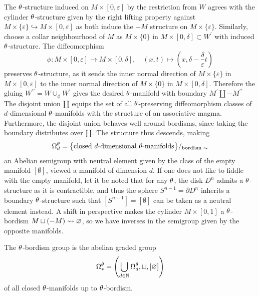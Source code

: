 The $\theta$-structure induced on $M\times[0,\varepsilon]$ by the restriction from $W$ agrees with the cylinder $\theta$-structure given by the right lifting property against $M\times\{\varepsilon\} \hookrightarrow M\times[0,\varepsilon]$ as both induce the $-M$ structure on $M\times\{\varepsilon\}$.
Similarly, choose a collar neighbourhood of $M$ as $M\times\{0\}$ in $M\times[0,\delta]\subset W^\prime$ with induced $\theta$-structure.
The diffeomorphism 
\begin{equation*}
    \phi\colon M\times[0,\varepsilon] \to M\times[0,\delta],\quad (x,t)\mapsto \left(x,\delta -\frac{\delta}{\varepsilon}t\right)
\end{equation*}
preserves $\theta$-structure, as it sends the inner normal direction of $M\times\{\varepsilon\}$ in $M\times[0,\varepsilon]$ to the inner normal direction of $M\times\{0\}$ in $M\times[0,\delta]$.
Therefore the gluing $W^{\prime\prime} = W \cup_\phi W^\prime$ gives the desired $\theta$-manifold with boundary $M^\prime\amalg -M^{\prime\prime}$
\endprf
The disjoint union $\amalg$ equips the set of all $\theta$-preserving diffeomorphism classes of $d$-dimensional $\theta$-manifolds with the structure of an associative magma.
Furthermore, the disjoint union behaves well around bordisms, since taking the boundary distributes over $\amalg$.
The structure thus descends, making
\begin{equation*}
    \Omega_d^\theta = \big\{\text{closed } d\text{-dimensional } \theta\text{-manifolds}\big\}/_{\text{bordism } \sim}
\end{equation*}
an Abelian semigroup with neutral element given by the class of the empty manifold $[\emptyset]$, viewed a manifold of dimension $d$.
If one does not like to fiddle with the empty manifold, let it be noted that for any $\theta$, the disk $D^n$ admits a $\theta$-structure as it is contractible, and thus the sphere $S^{n-1} = \partial D^n$ inherits a boundary $\theta$-structure such that $[S^{n-1}] = [\emptyset]$ can be taken as a neutral element instead.
A shift in perspective makes the cylinder $M\times [0,1]$ a $\theta$-bordism $M\sqcup (-M) \rightsquigarrow \varnothing$, so we have inverses in the semigroup given by the opposite manifolds.
\begin{defi}
    The $\theta$-bordism group is the abelian graded group
    \begin{equation*}
        \Omega_\ast^\theta = \left( \bigcup_{d\in\mathbb{N}} \Omega_d^\theta, \sqcup, [\varnothing] \right)
    \end{equation*}
    of all closed $\theta$-manifolds up to $\theta$-bordism.
\end{defi}

